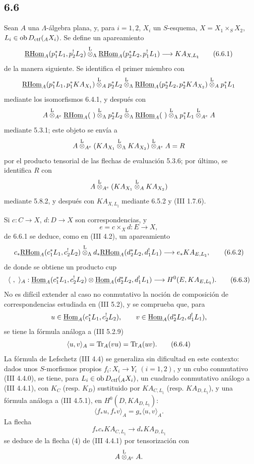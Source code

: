 \subsection*{6.6}
Sean $A$ una $\Lambda$-álgebra plana, y, para $i=1,2$, $X_i$ un $S$-esquema, $X=X_1\times_SX_2$, $L_i\in\operatorname{ob} D_{\mathrm{ctf}}({}_AX_i)$. Se define un apareamiento
\begin{equation}
\underline{\mathrm{RHom}}_A(p_1^*L_1,p_2^!L_2)
\overset{\mathrm L}{\otimes}_{\Lambda}
\underline{\mathrm{RHom}}_A(p_2^*L_2,p_1^!L_1)
\longrightarrow
KA_{X,L_{\natural}}
\tag{6.6.1}
\end{equation}
de la manera siguiente. Se identifica el primer miembro con
\[
\underline{\mathrm{RHom}}_A(p_1^*L_1,p_1^*KA_{X_1})
\overset{\mathrm L}{\otimes}_A p_2^*L_2
\overset{\mathrm L}{\otimes}_{\Lambda}
\underline{\mathrm{RHom}}_A(p_2^*L_2,p_2^*KA_{X_2})
\overset{\mathrm L}{\otimes}_A p_1^*L_1
\]
mediante los isomorfismos 6.4.1, y después con
\[
A\lten_{A^e}\uRHom_A(\ )\lten_{\Lambda}p_2^*L_2
 \lten_{\Lambda}\uRHom_A(\ )\lten_{\Lambda}p_1^*L_1\lten_{A^e}A
\]
mediante 5.3.1; este objeto se envía a
\[
A\overset{\mathrm L}{\otimes}_{A^e}(KA_{X_1}\overset{\mathrm L}{\otimes}_{\Lambda}KA_{X_2})\overset{\mathrm L}{\otimes}_{A^e}A=R
\]
por el producto tensorial de las flechas de evaluación 5.3.6; por último, se identifica $R$ con
\[
A\overset{\mathrm L}{\otimes}_{A^e}(KA_{X_1}\overset{\mathrm L}{\otimes}_A KA_{X_2})
\]
mediante 5.8.2, y después con $KA_{X,L_{\natural}}$ mediante 6.5.2 y (III 1.7.6).

Si $c:C\to X$, $d:D\to X$ son correspondencias, y
\[
e=c\times_Xd:E\to X,
\]
de 6.6.1 se deduce, como en (III 4.2), un apareamiento
\begin{equation}
c_*\underline{\mathrm{RHom}}_A(c_1^*L_1,c_2^!L_2)
\overset{\mathrm L}{\otimes}_{\Lambda}
d_*\underline{\mathrm{RHom}}_A(d_2^*L_2,d_1^!L_1)
\longrightarrow
e_*KA_{E,L_{\natural}},
\tag{6.6.2}
\end{equation}
de donde se obtiene un producto cup
\begin{equation}
\langle\ ,\ \rangle_A:
\underline{\operatorname{Hom}}_A(c_1^*L_1,c_2^!L_2)\otimes
\underline{\operatorname{Hom}}_A(d_2^*L_2,d_1^!L_1)
\longrightarrow
H^0(E,KA_{E,L_{\natural}}).
\tag{6.6.3}
\end{equation}
No es difícil extender al caso no conmutativo la noción de composición de correspondencias estudiada en (III 5.2), y se comprueba que, para
\[
u\in\underline{\operatorname{Hom}}_A(c_1^*L_1,c_2^!L_2),\qquad
v\in\underline{\operatorname{Hom}}_A(d_2^*L_2,d_1^!L_1),
\]
se tiene la fórmula análoga a (III 5.2.9)
\begin{equation}
\langle u,v\rangle_A=\operatorname{Tr}_A(vu)=\operatorname{Tr}_A(uv).
\tag{6.6.4}
\end{equation}
La fórmula de Lefschetz (III 4.4) se generaliza sin dificultad en este contexto: dados unos $S$-morfismos propios $f_i:X_i\to Y_i$ $(i=1,2)$, y un cubo conmutativo (III 4.4.0), se tiene, para $L_i\in\operatorname{ob} D_{\mathrm{ctf}}({}_AX_i)$, un cuadrado conmutativo análogo a (III 4.4.1), con $K_C$ (resp. $K_D$) sustituido por $KA_{C,L_{\natural}}$ (resp. $KA_{D,L_{\natural}}$), y una fórmula análoga a (III 4.5.1), en $H^0(D,KA_{D,L_{\natural}})$:
\begin{equation}
\langle f_*u,f_*v\rangle_A=g_*\langle u,v\rangle_A.
\tag{6.6.5}
\end{equation}
La flecha
\[
f_*c_*KA_{C,L_{\natural}}\longrightarrow d_*KA_{D,L_{\natural}}
\]
se deduce de la flecha (4) de (III 4.4.1) por tensorización con
\[
A\overset{\mathrm L}{\otimes}_{A^e}A .
\]
